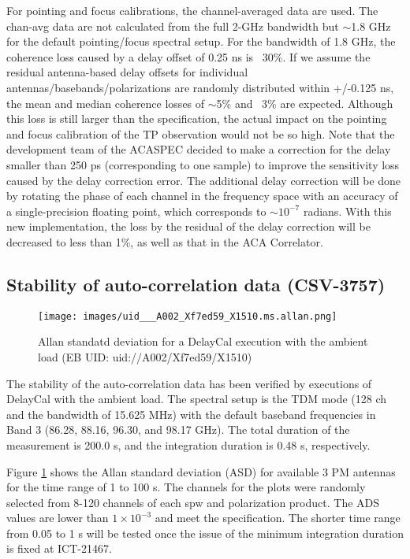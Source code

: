 For pointing and focus calibrations, the channel-averaged data are used. The chan-avg data are not calculated from the full 2-GHz bandwidth but $\sim$1.8 GHz for the default pointing/focus spectral setup. For the bandwidth of 1.8 GHz, the coherence loss caused by a delay offset of 0.25 ns is ~30\%. If we assume the residual antenna-based delay offsets for individual antennas/basebands/polarizations are randomly distributed within +/-0.125 ns, the mean and median coherence losses of $\sim$5\% and ~3\% are expected. Although this loss is still larger than the specification, the actual impact on the pointing and focus calibration of the TP observation would not be so high. Note that the development team of the ACASPEC decided to make a correction for the delay smaller than 250 ps (corresponding to one sample) to improve the sensitivity loss caused by the delay correction error. The additional delay correction will be done by rotating the phase of each channel in the frequency space with an accuracy of a single-precision floating point, which corresponds to $\sim 10^{-7}$ radians. With this new implementation, the loss by the residual of the delay correction will be decreased to less than 1\%, as well as that in the ACA Correlator.  



\subsection{Stability of auto-correlation data  (CSV-3757)}
\begin{figure}[htbp]
     \centering
     \texttt{[image: images/uid\_\_\_A002\_Xf7ed59\_X1510.ms.allan.png]}
     \caption{Allan standatd deviation for a DelayCal execution with the ambient load (EB UID: uid://A002/Xf7ed59/X1510)}
     \label{fig:Allan}
\end{figure}


The stability of the auto-correlation data has been verified by executions of DelayCal with the ambient load. The spectral setup is the TDM mode (128 ch and the bandwidth of 15.625 MHz) with the default baseband frequencies in Band 3 (86.28, 88.16, 96.30, and 98.17 GHz). The total duration of the measurement is 200.0 s, and the integration duration is 0.48 s, respectively. 

Figure \ref{fig:Allan} shows the Allan standard deviation (ASD) for available 3 PM antennas for the time range of 1 to 100 s. The channels for the plots were randomly selected from 8-120 channels of each spw and polarization product. The ADS values are lower than $1\times 10^{-3}$ and meet the specification. The shorter time range from 0.05 to 1 s will be tested once the issue of the minimum integration duration is fixed at ICT-21467.


